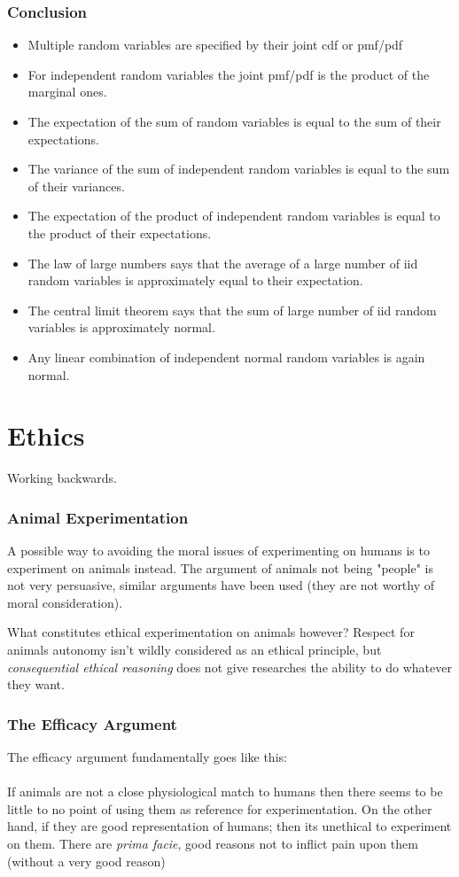 \documentclass{report}
\theoremstyle{definition}
\theoremstyle{plain}
\theoremstyle{remark}
\begin{document}
\subsection{Conclusion}
\begin{itemize}
  \item Multiple random variables are specified by their joint cdf or pmf/pdf
  \item For independent random variables the joint pmf/pdf is the product of
    the marginal ones.
  \item The expectation of the sum of random variables is equal to the sum of
    their expectations.
  \item The variance of the sum of independent random variables is equal to the
    sum of their variances.
  \item The expectation of the product of independent random variables is equal
    to the product of their expectations.
  \item The law of large numbers says that the average of a large number of iid
    random variables is approximately equal to their expectation.
  \item The central limit theorem says that the sum of large number of iid
    random variables is approximately normal.
  \item Any linear combination of independent normal random variables is again
    normal.
\end{itemize}



\chapter{Ethics}
Working backwards.
\subsection{Animal Experimentation}
A possible way to avoiding the moral issues of experimenting on humans is to
experiment on animals instead. The argument of animals not being "people" is
not very persuasive, similar arguments have been used (they are not worthy of
moral consideration).
\par
What constitutes ethical experimentation on animals however? Respect for
animals autonomy isn't wildly considered as an ethical principle, but
\textit{consequential ethical reasoning} does not give researches the ability
to do whatever they want.
\subsection{The Efficacy Argument}
The efficacy argument fundamentally goes like this:
\\\\
If animals are not a close physiological match to humans then there seems to be
little to no point of using them as reference for experimentation. On the other
hand, if they are good representation of humans; then its unethical to
experiment on them. There are \textit{prima facie}, good reasons not to inflict
pain upon them (without a very good reason)
\end{document}

